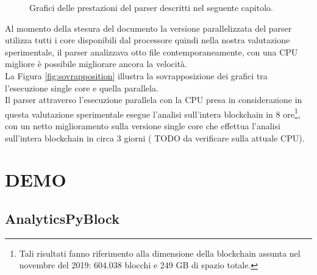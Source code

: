 \begin{figure}
	\centering
	\caption{Grafici delle prestazioni del parser descritti nel seguente capitolo.}
	\label{fig:analisisScript}
\end{figure}

Al momento della stesura del documento la versione parallelizzata del parser utilizza tutti i core disponibili dal processore quindi nella nostra valutazione sperimentale, il parser analizzava otto file contemporaneamente, con una CPU migliore è possibile migliorare ancora la velocità.\\
La Figura \ref{fig:sovrapposition} illustra la sovrapposizione dei grafici tra l'esecuzione single core e quella parallela.\\
Il parser attraverso l'esecuzione parallela con la CPU presa in considerazione in questa valutazione sperimentale esegue l'analisi sull'intera blockchain in 8 ore\footnote{Tali risultati fanno riferimento alla dimensione della blockchain assunta nel novembre del 2019: 604.038 blocchi e 249 GB di spazio totale.}, con un netto miglioramento sulla versione single core che effettua l'analisi sull'intera blockchain in circa 3 giorni ( TODO da verificare sulla attuale CPU).

\section{DEMO} \label{sec:solDemo}

\subsection{AnalyticsPyBlock} \label{sec:AnalyticsPyBlock}

